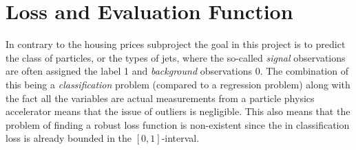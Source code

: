 

\FloatBarrier
\section{Loss and Evaluation Function}
\label{sec:q:loss_evaluation_function}

In contrary to the housing prices subproject the goal in this project is to predict the class of particles, or the types of jets, where the so-called \emph{signal} observations are often assigned the label \num{1} and \emph{background} observations \num{0}.  
The combination of this being a \emph{classification} problem (compared to a regression problem) along with the fact all the variables are actual measurements from a particle physics accelerator means that the issue of outliers is negligible. This also means that the problem of finding a robust loss function is non-existent since the in classification loss is already bounded in the $[0, 1]$-interval. 

